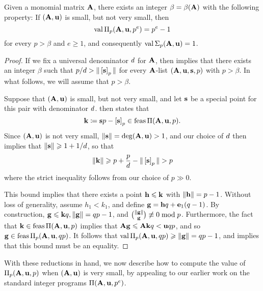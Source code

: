 \documentclass{article}
\begin{document}
\begin{theorem}
   \label{small not very small value: T}
   Given a monomial matrix $\mathbf{A}$, there exists an integer $\beta=\beta(\mathbf{A})$ with the following property\textup:
   If $(\mathbf{A}, \mathbf{u})$ is small, but not very small, then
   \[ \operatorname{val} \Pi_p(\mathbf{A}, \mathbf{u}, p^e) = p^e-1\]
   for every $p > \beta$ and $e \geq 1$, and consequently $\operatorname{val} \Sigma_p(\mathbf{A},\mathbf{u}) = 1$.
\end{theorem}

\begin{proof}
   If we fix a universal denominator $d$ for $\mathbf{A}$, then  implies that there exists an integer $\beta$ such that $p/d > \| \left[ \mathbf{s} \right]_p \|$ for every $\mathbf{A}$-list $(\mathbf{A},\mathbf{u},\mathbf{s}, p)$ with $p > \beta$.
   In what follows, we will assume that $p > \beta$.

   Suppose that $(\mathbf{A},\mathbf{u})$ is small, but not very small, and let $\mathbf{s}$ be a special point for this pair with denominator $d$.
    then states that
   \[ \mathbf{k} \coloneqq \mathbf{s}p-\left[ \mathbf{s} \right]_p \in \operatorname{feas} \Pi(\mathbf{A},\mathbf{u},p). \]
   Since $(\mathbf{A},\mathbf{u})$ is not very small, $\| \mathbf{s} \| = \operatorname{deg}(\mathbf{A},\mathbf{u}) > 1$, and our choice of $d$ then implies that $\| \mathbf{s} \| \geqslant 1 + 1/d$, so that
   \[\| \mathbf{k} \| \geqslant p + \frac{p}{d} - \| \left[ \mathbf{s} \right]_p \| > p\]
   where the strict inequality follows from our choice of $p \gg 0$.

   This bound implies that there exists a point $\mathbf{h} \leqslant \mathbf{k}$ with $\| \mathbf{h} \| = p-1$.
   Without loss of generality, assume $h_1 < k_1$, and define $\mathbf{g} = \mathbf{h}q + \mathbf{e}_1(q-1)$.
   By construction, $\mathbf{g} \leqslant \mathbf{k}q, \| \mathbf{g} \| = qp-1$, and $\binom{\| \mathbf{g} \|}{\mathbf{g}} \not\equiv 0 \bmod p$.
   Furthermore, the fact that $\mathbf{k} \in \operatorname{feas} \Pi(\mathbf{A},\mathbf{u},p)$ implies that $\mathbf{A}\mathbf{g} \leqslant \mathbf{A}{\mathbf{k}}q < \mathbf{u}qp$, and so $\mathbf{g} \in \operatorname{feas} \Pi_p(\mathbf{A},\mathbf{u},qp)$.
   It follows that $\operatorname{val} \Pi_p(\mathbf{A},\mathbf{u},qp) \geqslant \| \mathbf{g} \| = qp-1$, and  implies that this bound must be an equality.
\end{proof}

With these reductions in hand, we now describe how to compute the value of $\Pi_p(\mathbf{A}, \mathbf{u}, p)$ when $(\mathbf{A}, \mathbf{u})$ is very small,  by appealing to our earlier work on the standard integer programs $\Pi(\mathbf{A}, \mathbf{u}, p^e)$.
\end{document}
